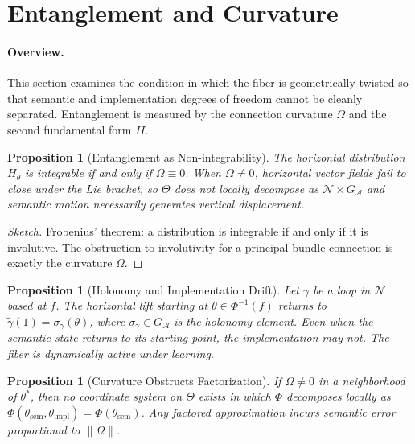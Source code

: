 \documentclass[twocolumn,10pt]{article}
\theoremstyle{thmstyle}
\newtheorem{proposition}[theorem]{Proposition}
\theoremstyle{defstyle}
\begin{document}
\section{Entanglement and Curvature}
\label{sec:entanglement}

\paragraph{Overview.}
This section examines the condition in which the fiber is geometrically
twisted so that semantic and implementation degrees of freedom cannot be
cleanly separated. Entanglement is measured by the connection curvature
$\Omega$ and the second fundamental form $II$.

\begin{proposition}[Entanglement as Non-integrability]
\label{prop:entanglement}
The horizontal distribution $H_\theta$ is integrable if and only if
$\Omega \equiv 0$. When $\Omega \neq 0$, horizontal vector fields fail
to close under the Lie bracket, so $\Theta$ does not locally decompose
as $\mathcal{N} \times G_\mathcal{A}$ and semantic motion necessarily
generates vertical displacement.
\end{proposition}

\begin{proof}[Sketch]
Frobenius' theorem: a distribution is integrable if and only if it is
involutive. The obstruction to involutivity for a principal bundle
connection is exactly the curvature $\Omega$.
\end{proof}

\begin{proposition}[Holonomy and Implementation Drift]
Let $\gamma$ be a loop in $\mathcal{N}$ based at $f$. The horizontal
lift starting at $\theta \in \Phi^{-1}(f)$ returns to
$\tilde\gamma(1) = \sigma_\gamma(\theta)$, where $\sigma_\gamma
\in G_\mathcal{A}$ is the holonomy element. Even when the semantic
state returns to its starting point, the implementation may not. The
fiber is dynamically active under learning.
\end{proposition}

\begin{proposition}[Curvature Obstructs Factorization]
If $\Omega \neq 0$ in a neighborhood of $\theta^*$, then no coordinate
system on $\Theta$ exists in which $\Phi$ decomposes locally as
$\Phi(\theta_{\mathrm{sem}}, \theta_{\mathrm{impl}}) =
\Phi(\theta_{\mathrm{sem}})$. Any factored approximation incurs
semantic error proportional to $\|\Omega\|$.
\end{proposition}
\end{document}
